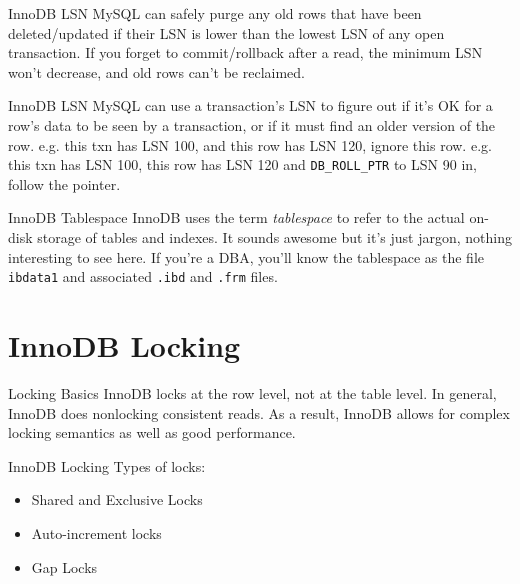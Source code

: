 \documentclass[14pt]{beamer}
\begin{document}
\begin{frame}{InnoDB LSN}
  MySQL can safely purge any old rows that have been deleted/updated if their
  LSN is lower than the lowest LSN of any open transaction.
  \newline
  \newline
  If you forget to commit/rollback after a read, the minimum LSN won't decrease,
  and old rows can't be reclaimed.
\end{frame}

\begin{frame}{InnoDB LSN}
  MySQL can use a transaction's LSN to figure out if it's OK for a row's data to
  be seen by a transaction, or if it must find an older version of the
  row.
  \pause
  \newline
  \newline
  e.g. this txn has LSN 100, and this row has LSN 120, ignore this row.
  \pause
  \newline
  \newline
  e.g. this txn has LSN 100, this row has LSN 120 and \texttt{DB\_ROLL\_PTR} to
  LSN 90 in, follow the pointer.
\end{frame}

\begin{frame}{InnoDB Tablespace}
  InnoDB uses the term \emph{tablespace} to refer to the actual on-disk storage
  of tables and indexes. It sounds awesome but it's just jargon, nothing
  interesting to see here.
  \newline
  \newline
  If you're a DBA, you'll know the tablespace as the file \texttt{ibdata1} and
  associated \texttt{.ibd} and \texttt{.frm} files.
\end{frame}

\section{InnoDB Locking}
\begin{frame}{Locking Basics}
  InnoDB locks at the row level, not at the table level. In general, InnoDB does
  nonlocking consistent reads. As a result, InnoDB allows for complex locking
  semantics as well as good performance.
\end{frame}

\begin{frame}{InnoDB Locking}
  Types of locks:
  \begin{itemize}
    \item Shared and Exclusive Locks
    \item Auto-increment locks
    \item Gap Locks
  \end{itemize}
\end{frame}
\end{document}
